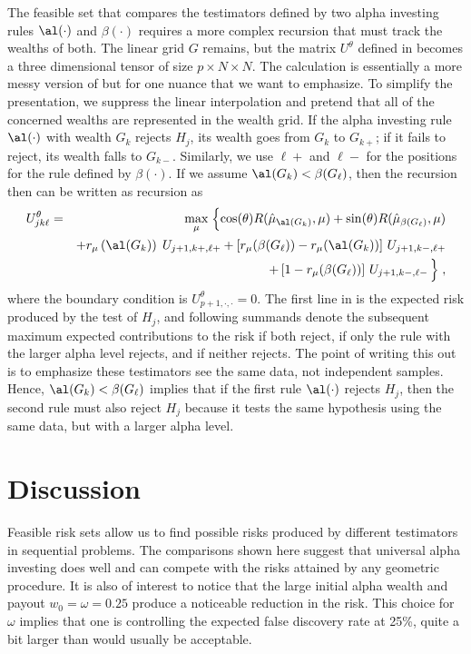 \documentclass[12pt]{article}
\begin{document}
 The feasible set that compares the testimators defined by two alpha investing
 rules $\al(\cdot)$ and $\beta(\cdot)$ requires a more complex recursion that
 must track the wealths of both.  The linear grid $G$ remains, but the matrix
 $U^\theta$ defined in  becomes a three dimensional tensor of size
 $p \times N \times N$.  The calculation is essentially a more messy version of
  but for one nuance that we want to emphasize.  To simplify the
 presentation, we suppress the linear interpolation and pretend that all of the
 concerned wealths are represented in the wealth grid.  If the alpha investing
 rule $\al(\cdot)$ with wealth $G_k$ rejects $H_j$, its wealth goes from $G_k$
 to $G_{k+}$; if it fails to reject, its wealth falls to $G_{k-}$.  Similarly,
 we use $\ell+$ and $\ell-$ for the positions for the rule defined by
 $\beta(\cdot)$.  If we assume $\al(G_k) < \beta(G_\ell)$, then the recursion
 then can be written as recursion as
 \begin{eqnarray}
   U^\theta_{jk\ell} &=&  \max_\mu \;\Bigl\{
     \cos(\theta) R(\hat\mu_{\al(G_k)}, \mu) 
       + \sin(\theta) R(\hat\mu_{\beta(G_\ell)},\mu) \cr
     & & + r_\mu\left(\al(G_k)\right) \; U_{j+1,k+,\ell+} 
         + \left[ r_\mu(\beta(G_\ell)) - r_\mu(\al(G_k)) \right] \, U_{j+1,k-,\ell+} \cr
     & & + \left[1-r_\mu(\beta(G_\ell))\right] \, U_{j+1,k-,\ell-} \, \Bigr\}\;,
 \label{eq:Ujkl}
 \end{eqnarray}
 where the boundary condition is $U_{p+1,\cdot,\cdot}^\theta= 0$.  The first
 line in  is the expected risk produced by the test of $H_j$, and
 following summands denote the subsequent maximum expected contributions to the
 risk if both reject, if only the rule with the larger alpha level rejects, and
 if neither rejects.  The point of writing this out is to emphasize these
 testimators see the same data, not independent samples.  Hence, $\al(G_k) <
 \beta(G_\ell)$ implies that if the first rule $\al(\cdot)$ rejects $H_j$, then
 the second rule must also reject $H_j$ because it tests the same hypothesis
 using the same data, but with a larger alpha level.


\section{ Discussion }

 Feasible risk sets allow us to find possible risks produced by different
 testimators in sequential problems.  The comparisons shown here suggest that
 universal alpha investing does well and can compete with the risks attained by
 any geometric procedure.  It is also of interest to notice that the large
 initial alpha wealth and payout $w_0 = \omega = 0.25$ produce a noticeable
 reduction in the risk.  This choice for $\omega$ implies that one is
 controlling the expected false discovery rate at 25\%, quite a bit larger than
 would usually be acceptable.
\end{document}
